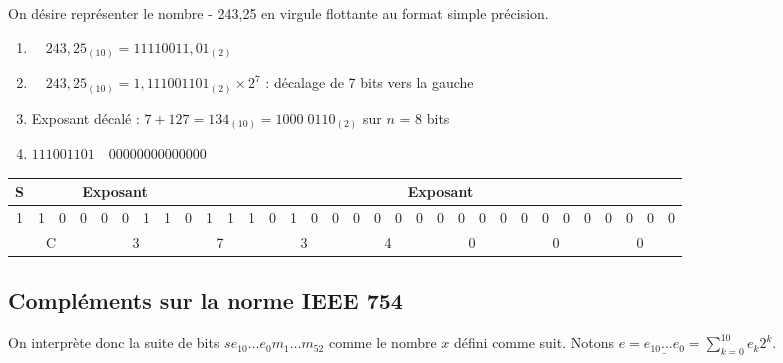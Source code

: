 \begin{exemple}
On désire représenter le nombre - 243,25 en virgule flottante au format simple précision.

\begin{enumerate}
\item $\quad 243,25_{(10)} =  11110011,01_{(2)}$
\item $\quad 243,25_{(10)} =  1,111001101_{(2)} \times  2^7$ : décalage de 7 bits vers la gauche
\item Exposant décalé : $7 + 127 = 134_{(10)} = 1000\; 0110_{(2)}$ 	sur $n$ = 8 bits
\item $111001101\quad 00000000000000$
\end{enumerate}
\end{exemple}


\footnotesize{
\begin{center}
\begin{tabular}{|c|c|c|c|c|c|c|c|c|c|c|c|c|c|c|c|c|c|c|c|c|c|c|c|c|c|c|c|c|c|c|c|}
\hline
S & \multicolumn{8}{c|}{Exposant} & \multicolumn{23}{c|}{Exposant} \\
\hline
1 & 1 & 0 & 0 & 0 & 0 & 1 & 1 & 0 & 1 & 1 & 1 & 0 & 1 & 0 & 0 & 
0 & 0 & 0 & 0 & 0 & 0 & 0 & 0 & 0 & 0 & 0 & 0 & 0 & 0 & 0 & 0 \\
\hline
\multicolumn{4}{|c|}{C} & \multicolumn{4}{c|}{3} & \multicolumn{4}{c|}{7} & 
\multicolumn{4}{|c|}{3} & \multicolumn{4}{|c|}{4} & \multicolumn{4}{c|}{0} & 
\multicolumn{4}{c|}{0} & \multicolumn{4}{|c|}{0} \\
\hline
\end{tabular}
\end{center}}

\normalsize

\subsection{Compléments sur la norme IEEE 754}


On interprète donc la suite de bits $se_{10}\ldots e_{0}m_{1}\ldots m_{52}$ comme le nombre $x$ défini comme suit. 
Notons $\displaystyle e  = \underline{e_{10}\ldots e_{0}} = \sum_{k=0}^{10} e_k2^k$. 

